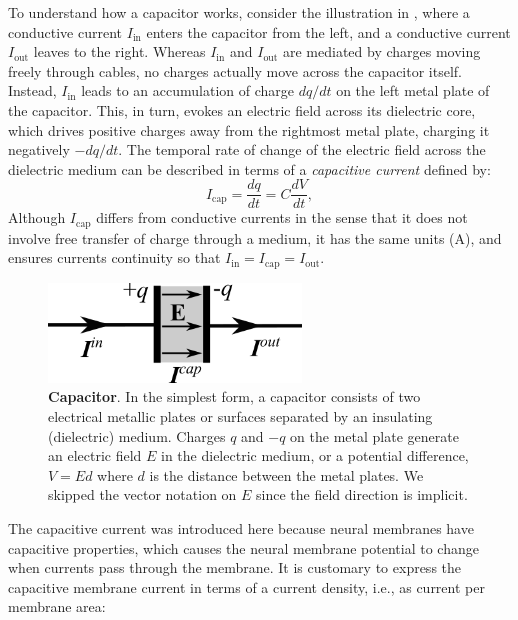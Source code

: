 To understand how a capacitor works, consider the illustration in , where a conductive current $I_\text{in}$ enters the capacitor from the left, and a conductive current $I_\text{out}$ leaves to the right. Whereas $I_\text{in}$ and $I_\text{out}$ are mediated by charges moving freely through cables, no charges actually move across the capacitor itself. Instead, $I_\text{in}$ leads to an accumulation of charge $dq/dt$ on the left metal plate of the capacitor. This, in turn, evokes an electric field across its dielectric core, which drives positive charges away from the rightmost metal plate, charging it negatively $-dq/dt$. The temporal rate of change of the electric field across the dielectric medium can be described in terms of a \textit{capacitive current} defined by:
\begin{equation}
I_\text{cap} = \frac{dq}{dt} = C\frac{dV}{dt},
\label{eq:Basics:Icap}
\end{equation}
Although $I_\text{cap}$ differs from conductive currents in the sense that it does not involve free transfer of charge through a medium, it has the same units (A), and ensures currents continuity so that $I_\text{in} = I_\text{cap} = I_\text{out}$. 

\begin{figure}[!ht]
\begin{center}
\includegraphics[width=0.6\textwidth]{Figures/Basics/Capacitor.png}
\end{center}
\caption{{\bf Capacitor}.  In the simplest form, a capacitor consists of two electrical metallic plates or surfaces separated by an insulating (dielectric) medium. Charges $q$ and $-q$ on the metal plate generate an electric field $E$ in the dielectric medium, or a potential difference, $V = Ed$ where $d$ is the distance between the metal plates. We skipped the vector notation on $E$ since the field direction is implicit.
}
\label{fig:Basics:Capacitor}
\end{figure}

The capacitive current was introduced here because neural membranes have capacitive properties, which causes the neural membrane potential to change when currents pass through the membrane. It is customary to express the capacitive membrane current in terms of a current density, i.e., as current per membrane area:

